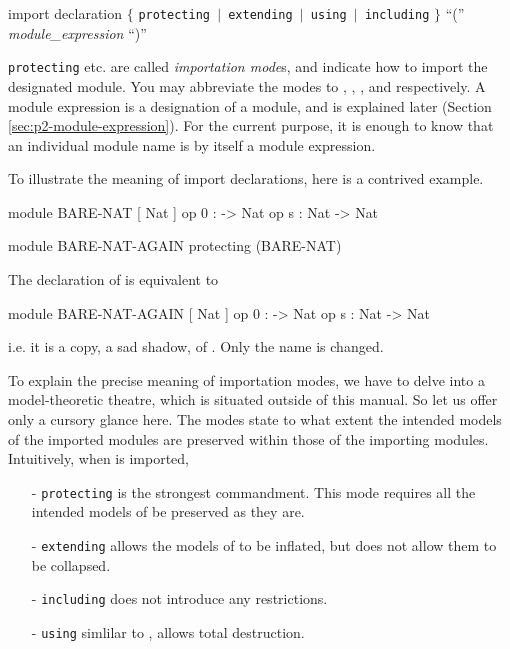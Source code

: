 \documentclass[a4paper]{memoir}
\begin{document}
\begin{bsyntax} import declaration \Hline
$\{$ \texttt{protecting $|$ extending $|$ using $|$ including} $\}$ ``('' \textit{module\_expression} ``)''
\end{bsyntax}

\verb|protecting| etc. are called {\em importation mode\/}s,
 and indicate how to import the designated module.
You may abbreviate the modes to , , , and 
respectively.
A module expression is a designation of a module, and is explained later
(Section \ref{sec:p2-module-expression}).
For the current purpose, it is enough to know that an individual module name
is by itself a module expression.

To illustrate the meaning of import declarations, here is a contrived example.
\begin{vvtm}
\begin{ccode}
   module BARE-NAT {
     [ Nat ]
     op 0 : -> Nat
     op s : Nat -> Nat
   }

   module BARE-NAT-AGAIN {
     protecting (BARE-NAT)
   }
\end{ccode}
\end{vvtm}
The declaration of  is equivalent to
\begin{vvtm}
\begin{ccode}
   module BARE-NAT-AGAIN {
     [ Nat ]
      op 0 : -> Nat
      op s : Nat -> Nat 
   }
\end{ccode}
\end{vvtm}
i.e. it is a copy, a sad shadow, of . Only the name is
changed.

To explain the precise meaning of importation modes, we have to delve into
a model-theoretic theatre, which is situated outside of this manual. So
let us offer only a cursory glance here.
The modes state to what extent the intended models of the imported modules
are preserved within those of the importing modules. Intuitively,
when  is imported,
\begin{itemize}
\item[-] \texttt{protecting} is the strongest
  commandment.
  This mode requires all the intended models of  be preserved
  as they are.
\item[-] \texttt{extending} allows the models of
   to be inflated, but does not allow them to be
  collapsed.
\item[-] \texttt{including} does not
  introduce any restrictions. 
\item[-] \texttt{using} simlilar to
  , allows total destruction.
\end{itemize}
\end{document}
